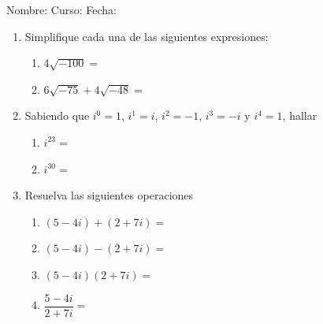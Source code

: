 \documentclass[fleqn]{article}
\newcommand{\LineaNombre}{%
\par
\vspace{\baselineskip}
Nombre:\hrulefill \; Curso: \underline{\hspace*{30pt}} \; Fecha: \underline{\hspace*{2.5cm}} \relax
\par}
\begin{document}
\LineaNombre
\begin{enumerate}
 \item Simplifique cada una de las siguientes expresiones:
 \begin{enumerate}
 \item $4\sqrt{-100}=$\noanswer
 \item $6\sqrt{-75}+4\sqrt{-48}=$ \noanswer
 \end{enumerate}
 \item Sabiendo que $i^{0}=1$, $i^{1}=i$, $i^{2}=-1$, $i^{3}=-i$ y $i^{4}=1$, hallar
 \begin{enumerate}
 \item $i^{23}=$\noanswer
 \item $i^{30}=$\noanswer
 \end{enumerate}
 \newpage
 \item Resuelva las siguientes operaciones
 \begin{enumerate}
 \item $(5-4i)+(2+7i)=$ \noanswer
 \item $(5-4i)-(2+7i)=$ \noanswer
 \item $(5-4i)(2+7i)=$ \noanswer
 \item $\dfrac{5-4i}{2+7i}=$ \noanswer
 \end{enumerate}
 \end{enumerate}
\end{document}
